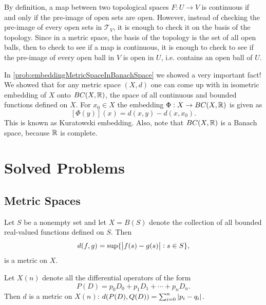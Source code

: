\begin{summary}
	By definition, a map between two topological spaces $ F:U\to V $ is continuous if and only if the pre-image of open sets are open. However, instead of checking the pre-image of every open sets in $ \mathcal{T}_V $, it is enough to check it on the basis of the topology. Since in a metric space, the basis of the topology is the set of all open balls, then to check to see if a map is continuous, it is enough to check to see if the pre-image of every open ball in $ V $ is open in $ U $, i.e. contains an open ball of $ U $.
\end{summary}

\begin{summary}
	In \autoref{prob:embeddingMetricSpaceInBanachSpace} we showed a very important fact! We showed that for any metric space $ (X,d) $ one can come up with in isometric embedding of $ X $ onto $ BC(X,\mathbb{R}) $, the space of all continuous and bounded functions defined on $ X $. For $ x_0 \in X $ the embedding $ \Phi: X\to BC(X,\mathbb{R}) $ is given as
	\[ [\Phi(y)](x) = d(x,y) - d(x,x_0). \]
	This is known as Kuratowski embedding. Also, note that $ BC(X,\mathbb{R}) $ is a Banach space, because $ \mathbb{R} $ is complete.
\end{summary}



\newpage
\section{Solved Problems}


\subsection{Metric Spaces}

\begin{summary}
	Let $ S $ be a nonempty set and let $ X = B(S) $ denote the collection of all bounded real-valued functions defined on $ S $. Then
	\[ d(f,g) = \sup\{\left|f(s)-g(s)\right|:s\in S\}, \]
	is a metric on $ X $.
\end{summary}

\begin{summary}
	Let $ X(n) $ denote all the differential operators of the form
	\[ P(D) = p_0D_0 + p_1D_1 + \cdots + p_nD_n. \]
	Then $ d $ is a metric on $ X(n) $:
	$ d(P(D),Q(D)) = \sum_{i=0}^{n} \left|p_i - q_i\right| $.
\end{summary}


